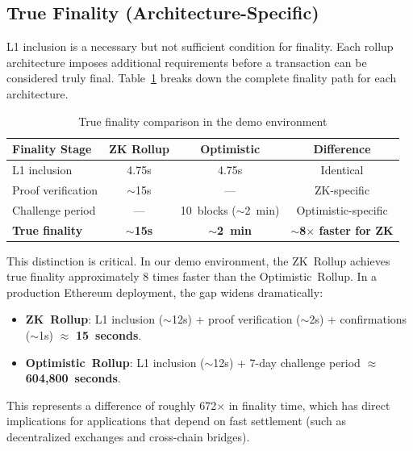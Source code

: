 \documentclass[
]{elteikthesis}[2024/04/26]
\begin{document}
\subsection{True Finality (Architecture-Specific)}

L1 inclusion is a necessary but not sufficient condition for finality. Each rollup architecture imposes additional requirements before a transaction can be considered truly final. Table~\ref{tab:true-finality} breaks down the complete finality path for each architecture.

\begin{table}[h]
    \centering
    \begin{tabular}{l|c|c|c}
        \hline
        \textbf{Finality Stage} & \textbf{ZK Rollup} & \textbf{Optimistic} & \textbf{Difference} \\
        \hline
        L1 inclusion & 4.75s & 4.75s & Identical \\
        \hline
        Proof verification & $\sim$15s & --- & ZK-specific \\
        \hline
        Challenge period & --- & 10~blocks ($\sim$2~min) & Optimistic-specific \\
        \hline
        \textbf{True finality} & \textbf{$\sim$15s} & \textbf{$\sim$2~min} & \textbf{$\sim$8$\times$ faster for ZK} \\
        \hline
    \end{tabular}
    \caption{True finality comparison in the demo environment}
    \label{tab:true-finality}
\end{table}

This distinction is critical. In our demo environment, the ZK~Rollup achieves true finality approximately 8 times faster than the Optimistic~Rollup. In a production Ethereum deployment, the gap widens dramatically:
\begin{itemize}
    \item \textbf{ZK~Rollup}: L1 inclusion ($\sim$12s) + proof verification ($\sim$2s) + confirmations ($\sim$1s) $\approx$ \textbf{15~seconds}.
    \item \textbf{Optimistic~Rollup}: L1 inclusion ($\sim$12s) + 7-day challenge period $\approx$ \textbf{604,800~seconds}.
\end{itemize}

This represents a difference of roughly 672$\times$ in finality time, which has direct implications for applications that depend on fast settlement (such as decentralized exchanges and cross-chain bridges).
\end{document}
